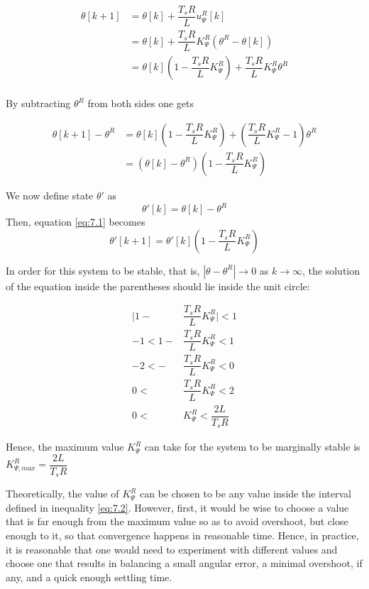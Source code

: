 \begin{align*}
  \theta[k+1] &= \theta[k] + \dfrac{T_s R}{L} u_{\Psi}^R[k]  \\
            ~ &= \theta[k] + \dfrac{T_s R}{L} K_{\Psi}^R (\theta^R - \theta[k]) \\
            ~ &= \theta[k](1 - \dfrac{T_s R}{L} K_{\Psi}^R) + \dfrac{T_s R}{L} K_{\Psi}^R \theta^R  \\
\end{align*}

By subtracting $\theta^R$ from both sides one gets

\begin{align}
  \theta[k+1] - \theta^R &= \theta[k](1 - \dfrac{T_s R}{L} K_{\Psi}^R) + (\dfrac{T_s R}{L} K_{\Psi}^R - 1) \theta^R \nonumber \\
                     ~ &= (\theta[k] - \theta^R)(1 - \dfrac{T_s R}{L} K_{\Psi}^R) \label{eq:7.1}
\end{align}

We now define state $\theta'$ as
$$\theta'[k] = \theta[k] - \theta^R$$
Then, equation \ref{eq:7.1} becomes
$$\theta'[k+1] = \theta'[k](1 - \dfrac{T_s R}{L} K_{\Psi}^R)$$

In order for this system to be stable, that is, $| \theta - \theta^R | \rightarrow 0$
as $k \rightarrow \infty$, the solution of the equation inside the parentheses
should lie inside the unit circle:

\begin{align}
  \Big|1 - &\dfrac{T_s R}{L} K_{\Psi}^R\Big| < 1 \nonumber \\
  -1 < 1 - &\dfrac{T_s R}{L} K_{\Psi}^R < 1 \nonumber \\
  -2 < - &\dfrac{T_s R}{L} K_{\Psi}^R < 0 \nonumber \\
   0 <\ &\dfrac{T_s R}{L} K_{\Psi}^R < 2 \nonumber \\
   0 <\ &K_{\Psi}^R < \dfrac{2L}{T_s R} \label{eq:7.2}
\end{align}

Hence, the maximum value $K_{\Psi}^R$ can take for the system to be marginally
stable is $K_{\Psi,max}^R = \dfrac{2L}{T_s R}$

Theoretically, the value of $K_{\Psi}^R$ can be chosen to be any value inside
the interval defined in inequality \ref{eq:7.2}. However, first, it would be
wise to choose a value that is far enough from the maximum value so as to avoid
overshoot, but close enough to it, so that convergence happens in reasonable
time. Hence, in practice, it is reasonable that one would need to experiment
with different values and choose one that results in balancing a small angular
error, a minimal overshoot, if any, and a quick enough settling time.

